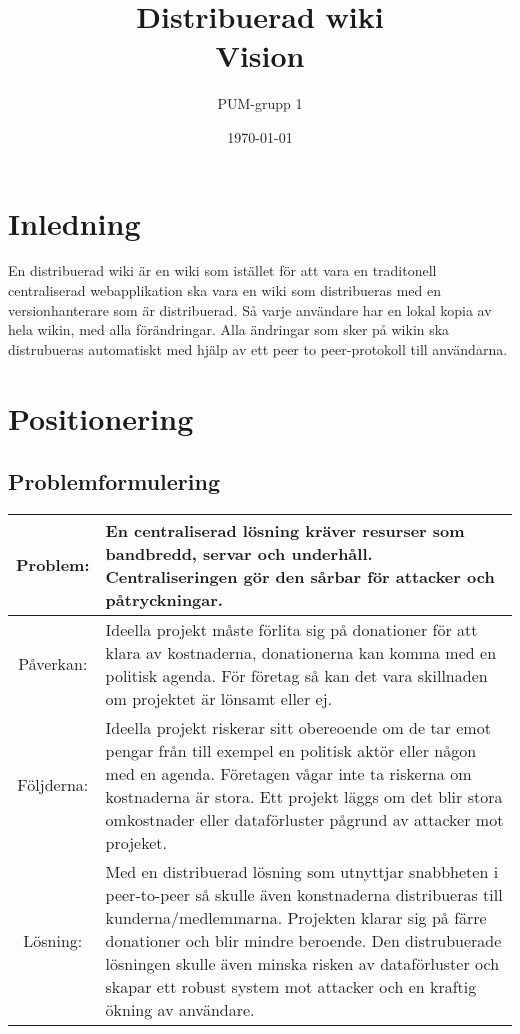 

\ifpdf
\else
\fi

\title{Distribuerad wiki \\ Vision}
\author{PUM-grupp 1}
\date{\today}



\maketitle

\thispagestyle{empty}
\newpage
\section{Inledning}
En distribuerad wiki är en wiki som istället för att vara en traditonell centraliserad webapplikation ska vara en wiki som distribueras med en versionhanterare som är distribuerad. Så varje användare har en lokal kopia av hela wikin, med alla förändringar. Alla ändringar som sker på wikin ska distrubueras automatiskt med hjälp av ett peer to peer-protokoll till användarna.
\section{Positionering}


\subsection{Problemformulering}
\begin{tabular}{|c|m{15 cm}|}
\hline
Problem: & En centraliserad lösning kräver resurser som bandbredd, servar och underhåll. Centraliseringen gör den sårbar för attacker och påtryckningar. \\
\hline
Påverkan: & Ideella projekt måste förlita sig på donationer för att klara av kostnaderna, donationerna kan komma med en politisk agenda. För företag så kan det vara skillnaden om projektet är lönsamt eller ej.   \\
\hline
Följderna: & Ideella projekt riskerar sitt obereoende om de tar emot pengar från till exempel en politisk aktör eller någon med en agenda. Företagen vågar inte ta riskerna om kostnaderna är stora. Ett projekt läggs om det blir stora omkostnader eller dataförluster pågrund av attacker mot projeket. \\
\hline
Lösning: & Med en distribuerad lösning som utnyttjar snabbheten i peer-to-peer så skulle även konstnaderna distribueras till kunderna/medlemmarna. Projekten klarar sig på färre donationer och blir mindre beroende. Den distrubuerade lösningen skulle även minska risken av dataförluster och skapar ett robust system mot attacker och en kraftig ökning av användare. \\
\hline
\end{tabular}

